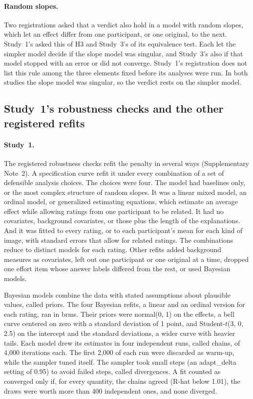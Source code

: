 \paragraph*{Random slopes.}
Two registrations asked that a verdict also hold in a model with random slopes, which let an effect differ from one participant, or one original, to the next. Study~1's asked this of H3 and Study~3's of its equivalence test. Each let the simpler model decide if the slope model was singular, and Study~3's also if that model stopped with an error or did not converge. Study~1's registration does not list this rule among the three elements fixed before its analyses were run. In both studies the slope model was singular, so the verdict rests on the simpler model.

\subsection*{Study~1's robustness checks and the other registered refits}

\paragraph*{Study~1.}
The registered robustness checks refit the penalty in several ways (Supplementary Note~2). A specification curve refit it under every combination of a set of defensible analysis choices. The choices were four. The model had baselines only, or the most complex structure of random slopes. It was a linear mixed model, an ordinal model, or generalized estimating equations, which estimate an average effect while allowing ratings from one participant to be related. It had no covariates, background covariates, or those plus the length of the explanations. And it was fitted to every rating, or to each participant's mean for each kind of image, with standard errors that allow for related ratings. The combinations reduce to \SOneSpecN{} distinct models for each rating. Other refits added background measures as covariates, left out one participant or one original at a time, dropped one effort item whose answer labels differed from the rest, or used Bayesian models.

Bayesian models combine the data with stated assumptions about plausible values, called priors. The four Bayesian refits, a linear and an ordinal version for each rating, ran in brms. Their priors were normal(0, 1) on the effects, a bell curve centered on zero with a standard deviation of 1 point, and Student-$t$(3, 0, 2.5) on the intercept and the standard deviations, a wider curve with heavier tails. Each model drew its estimates in four independent runs, called chains, of 4,000 iterations each. The first 2,000 of each run were discarded as warm-up, while the sampler tuned itself. The sampler took small steps (an adapt\_delta setting of 0.95) to avoid failed steps, called divergences. A fit counted as converged only if, for every quantity, the chains agreed (R-hat below 1.01), the draws were worth more than 400 independent ones, and none diverged.

